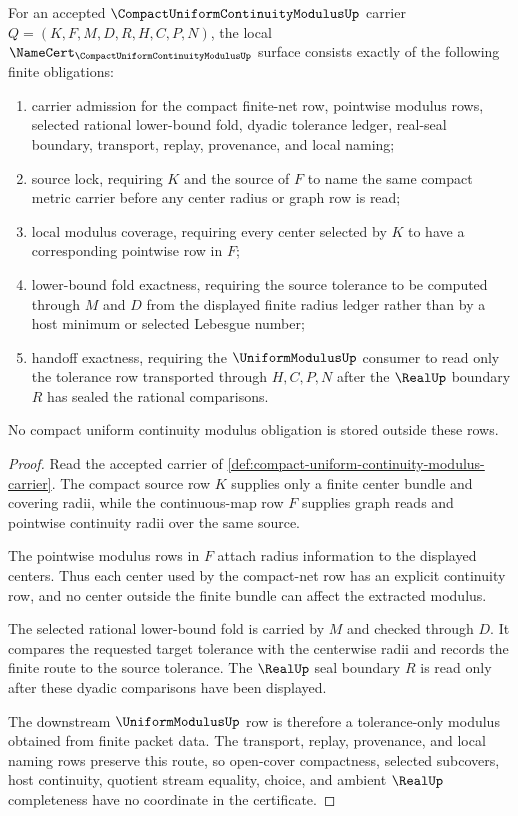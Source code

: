 \begin{theorem}
\label{thm:compact-uniform-continuity-modulus-namecert-obligations}
For an accepted $\CompactUniformContinuityModulusUp$ carrier $Q=(K,F,M,D,R,H,C,P,N)$, the local $\NameCert_{\CompactUniformContinuityModulusUp}$ surface consists exactly of the following finite obligations:
\begin{enumerate}
\item carrier admission for the compact finite-net row, pointwise modulus rows, selected rational lower-bound fold, dyadic tolerance ledger, real-seal boundary, transport, replay, provenance, and local naming;
\item source lock, requiring $K$ and the source of $F$ to name the same compact metric carrier before any center radius or graph row is read;
\item local modulus coverage, requiring every center selected by $K$ to have a corresponding pointwise row in $F$;
\item lower-bound fold exactness, requiring the source tolerance to be computed through $M$ and $D$ from the displayed finite radius ledger rather than by a host minimum or selected Lebesgue number;
\item handoff exactness, requiring the $\UniformModulusUp$ consumer to read only the tolerance row transported through $H,C,P,N$ after the $\RealUp$ boundary $R$ has sealed the rational comparisons.
\end{enumerate}
No compact uniform continuity modulus obligation is stored outside these rows.
\end{theorem}
\begin{proof}
Read the accepted carrier of \autoref{def:compact-uniform-continuity-modulus-carrier}. The compact source row $K$ supplies only a finite center bundle and covering radii, while the continuous-map row $F$ supplies graph reads and pointwise continuity radii over the same source.

The pointwise modulus rows in $F$ attach radius information to the displayed centers. Thus each center used by the compact-net row has an explicit continuity row, and no center outside the finite bundle can affect the extracted modulus.

The selected rational lower-bound fold is carried by $M$ and checked through $D$. It compares the requested target tolerance with the centerwise radii and records the finite route to the source tolerance. The $\RealUp$ seal boundary $R$ is read only after these dyadic comparisons have been displayed.

The downstream $\UniformModulusUp$ row is therefore a tolerance-only modulus obtained from finite packet data. The transport, replay, provenance, and local naming rows preserve this route, so open-cover compactness, selected subcovers, host continuity, quotient stream equality, choice, and ambient $\RealUp$ completeness have no coordinate in the certificate.
\end{proof}

